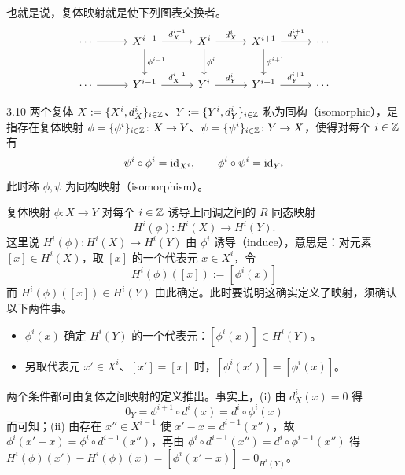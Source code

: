 
也就是说，复体映射就是使下列图表交换者。
\[
\begin{tikzcd}[row sep=2.4em, column sep=2.8em]
\cdots \arrow[r] & X^{i-1} \arrow[r,"d_X^{i-1}"] \arrow[d,"\phi^{i-1}"] & X^i \arrow[r,"d_X^i"] \arrow[d,"\phi^i"] & X^{i+1} \arrow[r,"d_X^{i+1}"] \arrow[d,"\phi^{i+1}"] & \cdots \\
\cdots \arrow[r] & Y^{i-1} \arrow[r,"d_X^{i-1}"] & Y^i \arrow[r,"d_Y^i"] & Y^{i+1} \arrow[r,"d_Y^{i+1}"] & \cdots
\end{tikzcd}
\]


\begin{definition}{3.10}
两个复体 $X:=\{X^i,d_X^i\}_{i\in\mathbb{Z}}$、$Y:=\{Y^i,d_Y^i\}_{i\in\mathbb{Z}}$ 称为同构（isomorphic），是指存在复体映射 $\phi=\{\phi^i\}_{i\in\mathbb{Z}}\colon X\to Y$、$\psi=\{\psi^i\}_{i\in\mathbb{Z}}\colon Y\to X$，使得对每个 $i\in\mathbb{Z}$ 有
\[
\psi^i\circ\phi^i=\mathrm{id}_{X^i},\qquad \phi^i\circ\psi^i=\mathrm{id}_{Y^i}
\]
此时称 $\phi,\psi$ 为同构映射（isomorphism）。
\end{definition}

复体映射 $\phi\colon X\to Y$ 对每个 $i\in\mathbb{Z}$ 诱导上同调之间的 $R$ 同态映射
\[
H^i(\phi)\colon H^i(X)\to H^i(Y).
\]
这里说 $H^i(\phi)\colon H^i(X)\to H^i(Y)$ 由 $\phi^i$ 诱导（induce），意思是：对元素 $[x]\in H^i(X)$，取 $[x]$ 的一个代表元 $x\in X^i$，令
\[
H^i(\phi)([x]):=[\phi^i(x)]
\]
而 $H^i(\phi)([x])\in H^i(Y)$ 由此确定。此时要说明这确实定义了映射，须确认以下两件事。
\begin{itemize}
\item[(i)] $\phi^i(x)$ 确定 $H^i(Y)$ 的一个代表元：$[\phi^i(x)]\in H^i(Y)$。
\item[(ii)] 另取代表元 $x'\in X^i$、$[x']=[x]$ 时，$[\phi^i(x')]=[\phi^i(x)]$。
\end{itemize}
两个条件都可由复体之间映射的定义推出。事实上，(i) 由 $d_X^i(x)=0$ 得
\[
0_Y=\phi^{i+1}\circ d^i(x)=d^i\circ\phi^i(x)
\]
而可知；(ii) 由存在 $x''\in X^{i-1}$ 使 $x'-x=d^{i-1}(x'')$，故 $\phi^i(x'-x)=\phi^i\circ d^{i-1}(x'')$，再由 $\phi^i\circ d^{i-1}(x'')=d^i\circ\phi^{i-1}(x'')$ 得 $H^i(\phi)(x')-H^i(\phi)(x)=[\phi^i(x'-x)]=0_{H^i(Y)}$。

